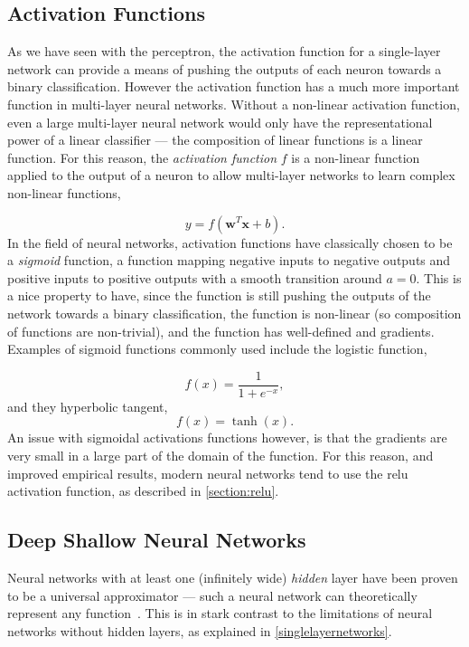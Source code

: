 \documentclass[thesis]{subfiles}
\begin{document}
\subsection{Activation Functions}
As we have seen with the perceptron, the activation function for a single-layer network can provide a means of pushing the outputs of each neuron towards a binary classification. However the activation function has a much more important function in multi-layer neural networks. Without a non-linear activation function, even a large multi-layer neural network would only have the representational power of a linear classifier --- the composition of linear functions is a linear function. For this reason, the \emph{activation function} $f$ is a non-linear function applied to the output of a neuron to allow multi-layer networks to learn complex non-linear functions,

\begin{equation}
y = f\left(\mathbf{w}^T\mathbf{x} + b\right).
\end{equation}
%
In the field of neural networks, activation functions have classically chosen to be a \emph{sigmoid} function, \ie{}a function mapping negative inputs to negative outputs and positive inputs to positive outputs with a smooth transition around $a = 0$. This is a nice property to have, since the function is still pushing the outputs of the network towards a binary classification, the function is non-linear (so composition of functions are non-trivial), and the function has well-defined and gradients. Examples of sigmoid functions commonly used include the logistic function, 

\begin{equation}
	f(x) = \frac{1}{1+e^{-x}},
\end{equation}
%
and they hyperbolic tangent,
\begin{equation}
	f(x) = \tanh(x).
\end{equation}
%
An issue with sigmoidal activations functions however, is that the gradients are very small in a large part of the domain of the function. For this reason, and improved empirical results, modern neural networks tend to use the \gls{relu} activation function, as described in \cref{section:relu}.


\subsection{Deep \vs Shallow Neural Networks}
Neural networks with at least one (infinitely wide) \emph{hidden} layer have been proven to be a universal approximator --- \ie such a neural network can theoretically represent any function~\citep{journals/mcss/Cybenko92,hornik89a}. This is in stark contrast to the limitations of neural networks without hidden layers, as explained in \cref{singlelayernetworks}.
\end{document}
